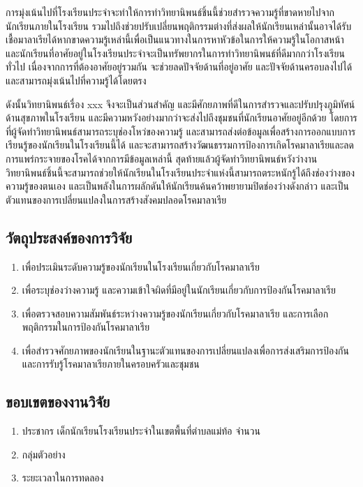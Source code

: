 การมุ่งเน้นไปที่โรงเรียนประจำจะทำให้การทำวิทยานิพนธ์ชิ้นนี้ช่วยสำรวจความรู้ที่ขาดหายไปจากนักเรียนภายในโรงเรียน รวมไปถึงช่วยปรับเปลี่ยนพฤติกรรมต่างที่ส่งผลให้นักเรียนเหล่านั้นอาจได้รับเชื้อมาลาเรียได้หากขาดความรู้เหล่านี้เพื่อเป็นแนวทางในการหาหัวข้อในการให้ความรู้ในโอกาสหน้า และนักเรียนที่อาศัยอยู่ในโรงเรียนประจำจะเป็นทรัพยากรในการทำวิทยานิพนธ์ที่ดีมากกว่าโรงเรียนทั่วไป เนื่องจากการที่ต้องอาศัยอยู่รวมกัน จะช่วยลดปัจจัยด้านที่อยู่อาศัย และปัจจัยด้านครอบลงไปได้ และสามารถมุ่งเน้นไปที่ความรู้ได้โดยตรง

ดังนั้นวิทยานิพนธ์เรื่อง xxx จึงจะเป็นส่วนสำคัญ และมีศักยภาพที่ดีในการสำรวจและปรับปรุงภูมิทัศน์ด้านสุขภาพในโรงเรียน และมีความหวังอย่างมากว่าจะส่งไปถึงชุมชนที่นักเรียนอาศัยอยู่อีกด้วย โดยการที่ผู้จัดทำวิทยานิพนธ์สามารถระบุช่องโหว่ของความรู้ และสามารถส่งต่อข้อมูลเพื่อสร้างการออกแบบการเรียนรู้ของนักเรียนในโรงเรียนนี้ได้ และจะสามารถสร้างวัฒนธรรมการป้องการเกิดโรคมาลาเรียและลดการแพร่กระจายของโรคได้จากการมีข้อมูลเหล่านี้ สุดท้ายแล้วผู้จัดทำวิทยานิพนธ์หวังว่างานวิทยานิพนธ์ชิ้นนี้จะสามารถช่วยให้นักเรียนในโรงเรียนประจำแห่งนี้สามารถตระหนักรู้ได้ถึงช่องว่างของความรู้ของตนเอง และเป็นพลังในการผลักดันให้นักเรียนค้นคว้าพยายามปิดช่องว่างดังกล่าว และเป็นตัวแทนของการเปลี่ยนแปลงในการสร้างสังคมปลอดโรคมาลาเรีย

\subsection{วัตถุประสงค์ของการวิจัย}
\begin{enumerate}
  \item เพื่อประเมินระดับความรู้ของนักเรียนในโรงเรียนเกี่ยวกับโรคมาลาเรีย
  \item เพื่อระบุช่องว่างความรู้ และความเข้าใจผิดที่มีอยู่ในนักเรียนเกี่ยวกับการป้องกันโรคมาลาเรีย
  \item เพื่อตรวจสอบความสัมพันธ์ระหว่างความรู้ของนักเรียนเกี่ยวกับโรคมาลาเรีย และการเลือกพฤติกรรมในการป้องกันโรคมาลาเรีย
  \item เพื่อสำรวจศักยภาพของนักเรียนในฐานะตัวแทนของการเปลี่ยนแปลงเพื่อการส่งเสริมการป้องกันและการรับรู้โรคมาลาเรียภายในครอบครัวและชุมชน
\end{enumerate}



\subsection{ขอบเขตของงานวิจัย}
\begin{enumerate}
  \item ประชากร
        เด็กนักเรียนโรงเรียนประจำในเขตพื้นที่ตำบลแม่ท้อ จำนวน
  \item กลุ่มตัวอย่าง
  \item ระยะเวลาในการทดลอง
\end{enumerate}

